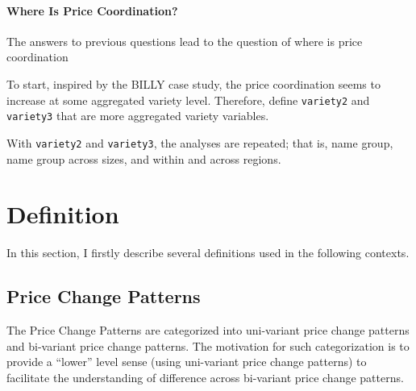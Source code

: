 \paragraph{Where Is Price Coordination?}

The answers to previous questions lead to the question of where is price coordination

To start, inspired by the BILLY case study, the price coordination seems to increase at some aggregated variety level. Therefore, define \texttt{variety2} and \texttt{variety3} that are more aggregated variety variables.

With \texttt{variety2} and \texttt{variety3}, the analyses are repeated; that is, name group, name group across sizes, and within and across regions.


\clearpage
\tableofcontents

\clearpage
\section{Definition}

In this section, I firstly describe several definitions used in the following contexts.

\subsection{Price Change Patterns}

The Price Change Patterns are categorized into uni-variant price change patterns and bi-variant price change patterns. The motivation for such categorization is to provide a ``lower'' level sense (using uni-variant price change patterns) to facilitate the understanding of difference across bi-variant price change patterns.

